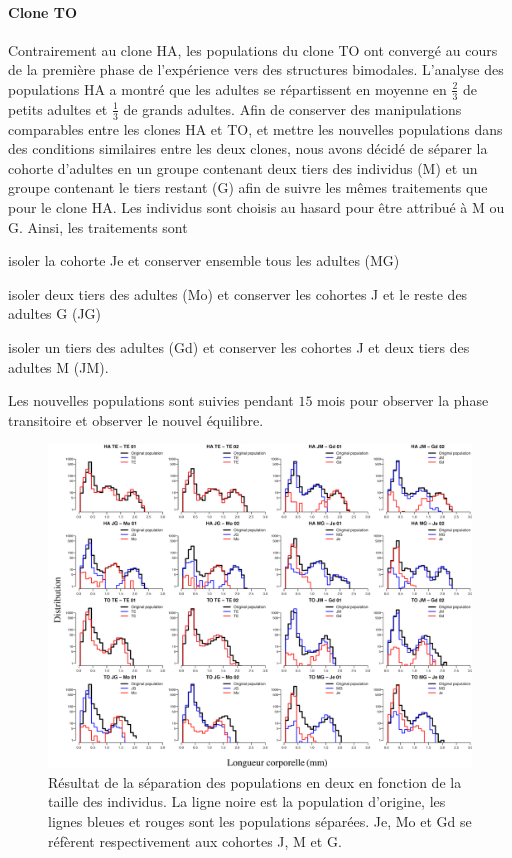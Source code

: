 \paragraph{Clone TO} Contrairement au clone HA, les populations du clone TO ont
convergé au cours de la première phase de l'expérience vers des structures
bimodales. L'analyse des populations HA a montré que les adultes se répartissent
en moyenne en $\frac{2}{3}$ de petits adultes et $\frac{1}{3}$ de grands
adultes. Afin de conserver des manipulations comparables entre les clones HA et
TO, et mettre les nouvelles populations dans des conditions similaires entre les
deux clones, nous avons décidé de séparer la cohorte d'adultes en un groupe
contenant deux tiers des individus (M) et un groupe contenant le tiers restant
(G) afin de suivre les mêmes traitements que pour le clone HA. Les individus
sont choisis au hasard pour être attribué à M ou G.
Ainsi, les traitements sont \begin{enumerate*}[label=(\roman*), before=\unskip{ : }, itemjoin={{ ; }},
itemjoin*={{ ; et }}]
\item isoler la cohorte Je et conserver ensemble tous les adultes (MG)
\item isoler deux tiers des adultes (Mo) et conserver les cohortes J et le reste
des adultes G (JG)
\item isoler un tiers des adultes (Gd) et conserver les cohortes J et deux tiers
des adultes M (JM).
\end{enumerate*} 
Les nouvelles populations sont suivies pendant $15$ mois pour observer la phase
transitoire et observer le nouvel équilibre. 

\begin{figure}[!ht]
\begin{center}
\includegraphics[width=1\textwidth]{1_CorpsDeThese/Resumes/Fig/SM01}
\caption[Séparation des
populations]{Résultat de la séparation des populations en deux en fonction de
la taille des individus. La ligne noire est la population d'origine, les lignes
bleues et rouges sont les populations séparées. Je, Mo et Gd se réfèrent
respectivement aux cohortes J, M et G.}
\label{fig:SM1}
\end{center}
\end{figure}

